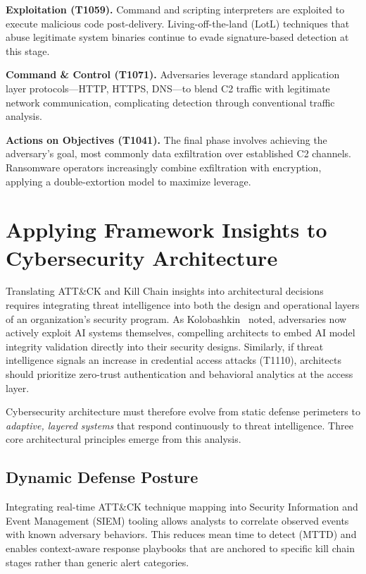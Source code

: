 \documentclass[sigconf,nonacm]{acmart}
\begin{document}
\textbf{Exploitation (T1059).}
Command and scripting interpreters are exploited to execute malicious code post-delivery.
Living-off-the-land (LotL) techniques that abuse legitimate system binaries continue
to evade signature-based detection at this stage.

\textbf{Command \& Control (T1071).}
Adversaries leverage standard application layer protocols---HTTP, HTTPS, DNS---to
blend C2 traffic with legitimate network communication, complicating detection through
conventional traffic analysis.

\textbf{Actions on Objectives (T1041).}
The final phase involves achieving the adversary's goal, most commonly data exfiltration
over established C2 channels. Ransomware operators increasingly combine exfiltration
with encryption, applying a double-extortion model to maximize leverage.

\section{Applying Framework Insights to Cybersecurity Architecture}
\label{sec:architecture}

Translating ATT\&CK and Kill Chain insights into architectural decisions requires
integrating threat intelligence into both the design and operational layers of an
organization's security program. As Kolobashkin~\cite{kolobashkin2025} noted, adversaries
now actively exploit AI systems themselves, compelling architects to embed AI model
integrity validation directly into their security designs. Similarly, if threat intelligence
signals an increase in credential access attacks (T1110), architects should prioritize
zero-trust authentication and behavioral analytics at the access layer.

Cybersecurity architecture must therefore evolve from static defense perimeters to
\emph{adaptive, layered systems} that respond continuously to threat intelligence.
Three core architectural principles emerge from this analysis.

\subsection{Dynamic Defense Posture}

Integrating real-time ATT\&CK technique mapping into Security Information and
Event Management (SIEM) tooling allows analysts to correlate observed events with
known adversary behaviors. This reduces mean time to detect (MTTD) and enables
context-aware response playbooks that are anchored to specific kill chain stages rather
than generic alert categories.
\end{document}
